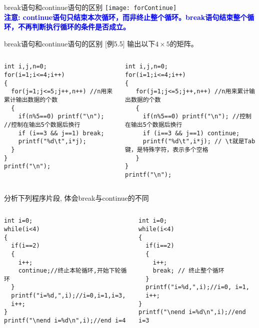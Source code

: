 \begin{frame}{break语句和continue语句的区别}
\texttt{[image: forContinue]}\\
\textbf{\textcolor{blue}{注意: continue语句只结束本次循环，而非终止整个循环。break语句结束整个循环，不再判断执行循环的条件是否成立。}}
\end{frame}

\begin{frame}{break语句和continue语句的区别}
\small $[$例5.5$]$ 输出以下$4\times 5$的矩阵。
\vspace{-0.5cm}
\begin{columns}
\begin{lstlisting}
int i,j,n=0;
for(i=1;i<=4;i++)
{
  for(j=1;j<=5;j++,n++) //n用来累计输出数据的个数
  {
    if(n%5==0) printf("\n"); //控制在输出5个数据后换行
    if (i==3 && j==1) break;
    printf("%d\t",i*j);
  } 
} 
printf("\n");  
\end{lstlisting}
\vspace{-0.3cm}
\begin{lstlisting}[frame=leftline]
int i,j,n=0;
for(i=1;i<=4;i++)
{
   for(j=1;j<=5;j++,n++) //n用来累计输出数据的个数
   {
     if(n%5==0) printf("\n"); //控制在输出5个数据后换行
     if (i==3 && j==1) continue;
     printf("%d\t",i*j); // \t就是Tab键，是特殊字符，表示多个空格
   } 
} 
printf("\n");    
\end{lstlisting}
\end{columns}
\end{frame}

\begin{frame}[fragile]{分析下列程序片段, 体会break与continue的不同}
\vspace{-0.5cm}
\begin{columns}
\begin{lstlisting}
int i=0;
while(i<4)
{
  if(i==2) 
  {
    i++;
    continue;//终止本轮循环,开始下轮循环 
  }
  printf("i=%d,",i);//i=0,i=1,i=3,
  i++;
}
printf("\nend i=%d\n",i);//end i=4
\end{lstlisting} 
\begin{lstlisting}[frame=leftline]
int i=0;
while(i<4)
{
  if(i==2) 
  {
    i++;
    break; // 终止整个循环 
  }
  printf("i=%d,",i);//i=0, i=1, 
  i++;
}
printf("\nend i=%d\n",i);//end i=3 
\end{lstlisting} 
\end{columns}
\end{frame}

